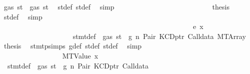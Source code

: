 \begin{isabellebody}
\ {\isachardoublequoteopen}gas\ st{\isacharprime}{\kern0pt}{\isacharprime}{\kern0pt}\ {\isasymle}\ gas\ st{\isacharprime}{\kern0pt}{\isachardoublequoteclose}\ \isamarkupfalse%
\ st{\isacharprime}{\kern0pt}{\isacharunderscore}{\kern0pt}def\ st{\isacharprime}{\kern0pt}{\isacharprime}{\kern0pt}{\isacharunderscore}{\kern0pt}def\ \isamarkupfalse%
\ simp\isanewline
\ \ \ \ \ \ \ \ \ \ \ \ \ \ \ \ \ \ \ \ \ \ \ \ \isamarkupfalse%
\ \isamarkupfalse%
\ {\isacharquery}{\kern0pt}thesis\ \isamarkupfalse%
\ st{\isacharprime}{\kern0pt}{\isacharunderscore}{\kern0pt}def\ \isamarkupfalse%
\ simp\isanewline
\ \ \ \ \ \ \ \ \ \ \ \ \ \ \ \ \ \ \ \ \ \ \isamarkupfalse%
\isanewline
\ \ \ \ \ \ \ \ \ \ \ \ \ \ \ \ \ \ \ \ \isamarkupfalse%
\isanewline
\ \ \ \ \ \ \ \ \ \ \ \ \ \ \ \ \ \ \isamarkupfalse%
\isanewline
\ \ \ \ \ \ \ \ \ \ \ \ \ \ \ \ \isamarkupfalse%
\isanewline
\ \ \ \ \ \ \ \ \ \ \ \ \ \ \ \ \ \ \isamarkupfalse%
\ {\isacharparenleft}{\kern0pt}e\ x{\isacharparenright}{\kern0pt}\isanewline
\ \ \ \ \ \ \ \ \ \ \ \ \ \ \ \ \ \ \isamarkupfalse%
\ {}{\isacharparenleft}{\kern0pt}{}{\isacharparenright}{\kern0pt}\ stmt{\isacharunderscore}{\kern0pt}def\ {\isacharbackquoteopen}{\isasymnot}\ gas\ st\ {\isasymle}\ g{\isacharbackquoteclose}\ n\ Pair\ KCDptr\ Calldata\ MTArray\ \isamarkupfalse%
\ {\isacharquery}{\kern0pt}thesis\ \isamarkupfalse%
\ stmt{\isachardot}{\kern0pt}psimps{\isacharparenleft}{\kern0pt}{}{\isacharparenright}{\kern0pt}\ g{\isacharunderscore}{\kern0pt}def\ st{\isacharprime}{\kern0pt}{\isacharunderscore}{\kern0pt}def\ st{\isacharprime}{\kern0pt}{\isacharprime}{\kern0pt}{\isacharunderscore}{\kern0pt}def\ \isamarkupfalse%
\ simp\isanewline
\ \ \ \ \ \ \ \ \ \ \ \ \ \ \ \ \isamarkupfalse%
\isanewline
\ \ \ \ \ \ \ \ \ \ \ \ \ \ \isamarkupfalse%
\isanewline
\ \ \ \ \ \ \ \ \ \ \ \ \ \ \ \ \isamarkupfalse%
\ {\isacharparenleft}{\kern0pt}MTValue\ x{}{\isacharparenright}{\kern0pt}\isanewline
\ \ \ \ \ \ \ \ \ \ \ \ \ \ \ \ \isamarkupfalse%
\ {}{\isacharparenleft}{\kern0pt}{}{\isacharparenright}{\kern0pt}\ stmt{\isacharunderscore}{\kern0pt}def\ {\isacharbackquoteopen}{\isasymnot}\ gas\ st\ {\isasymle}\ g{\isacharbackquoteclose}\ n\ Pair\ KCDptr\ Calldata\ \isamarkupfalse%

\end{isabellebody}

